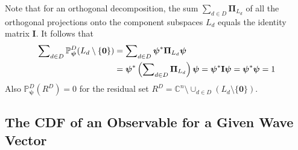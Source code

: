 \documentclass[11pt]{article}
\newcommand \C { \mathbb{C} }
\begin{document}
Note that for an orthogonal decomposition,
the sum $ \sum _{d \in D} \boldsymbol \Pi _{ L_d }$ of all the orthogonal projections 
onto the component subspaces $ L_d $ equals the identity matrix $ \mathbf I$.
It follows that
\begin{align}
   \sum\nolimits _{d \in D} 
   \mathbb P^D_{ \boldsymbol \psi } ( L_d \setminus \{ \mathbf 0 \} ) 
 &= \sum\nolimits _{d \in D} \boldsymbol \psi ^* \boldsymbol \Pi _{ L_d } \boldsymbol \psi 
 \notag \\
 &= \boldsymbol \psi ^* \left( \sum\nolimits _{d \in D} \boldsymbol \Pi _{ L_d } \right)
 	 \boldsymbol \psi 
 = \boldsymbol \psi ^* \mathbf I \boldsymbol \psi = \boldsymbol \psi ^* \boldsymbol \psi 
 = 1 \label{eq:normProbs}
\end{align}
Also $ \mathbb P^D_{ \boldsymbol \psi } ( R^D ) = 0$ for the residual set
 \( R^D = \C^n \setminus \cup _{d \in D} ( L_d \setminus \{ \mathbf 0\} ) \).

\subsection{The CDF of an Observable for a Given Wave Vector}
\end{document}
